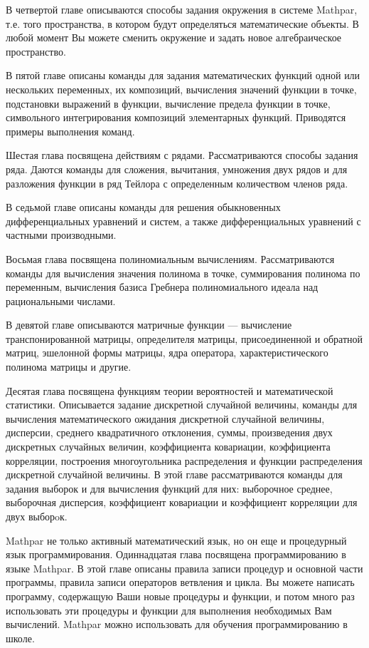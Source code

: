 В четвертой главе описываются способы задания окружения в системе Mathpar, т.е. того пространства, 
в котором будут определяться математические объекты. 
В любой момент Вы можете сменить окружение и задать новое алгебраическое пространство.  

В пятой главе описаны команды для задания математических функций одной или нескольких переменных, их композиций, вычисления значений функции в точке, подстановки выражений в функции, вычисление предела функции в точке, символьного интегрирования композиций элементарных функций. Приводятся примеры выполнения   команд. 

Шестая глава посвящена действиям с рядами. Рассматриваются способы задания ряда. Даются команды для сложения, вычитания, умножения двух рядов и для разложения функции в ряд Тейлора с определенным количеством членов ряда. 

В седьмой главе описаны команды для решения обыкновенных дифференциальных уравнений и систем, а также   дифференциальных уравнений с частными производными.

Восьмая глава посвящена полиномиальным вычислениям. Рассматриваются команды для вычисления значения полинома в точке, суммирования полинома по переменным, вычисления базиса Гребнера полиномиального идеала над рациональными числами. 

В девятой главе описываются матричные функции --- вычисление транспонированной матрицы, определителя матрицы, присоединенной и обратной матриц, эшелонной формы матрицы, ядра оператора, характеристического полинома матрицы и другие.

Десятая глава посвящена функциям теории вероятностей и математической статистики. Описывается задание дискретной случайной величины,  команды для вычисления математического ожидания дискретной случайной величины, дисперсии, среднего квадратичного отклонения, суммы, произведения двух дискретных случайных величин, коэффициента ковариации, коэффициента корреляции, построения многоугольника распределения и функции распределения дискретной случайной величины. В этой главе рассматриваются команды для задания выборок и для вычисления функций для них: выборочное среднее, выборочная дисперсия, коэффициент ковариации  и коэффициент корреляции для двух выборoк.

Mathpar не только активный математический язык, но он еще и процедурный язык программирования.
Одиннадцатая глава посвящена программированию в языке Mathpar. В этой главе описаны правила записи процедур и основной части программы,  правила записи операторов ветвления и цикла.  Вы можете написать программу, содержащую Ваши новые процедуры и функции, и потом много раз использовать эти процедуры и функции для выполнения необходимых Вам вычислений. Mathpar можно использовать для обучения программированию в школе.

